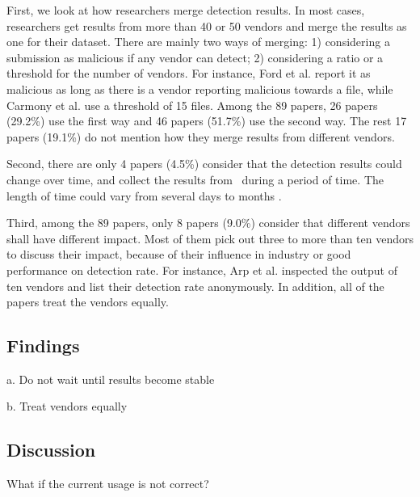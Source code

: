 First, we look at how researchers merge detection results. 
In most cases, researchers get results from more than 40 or 50 vendors and merge the results as one for their dataset. 
There are mainly two ways of merging: 1) considering a submission as malicious if any vendor can detect; 2) considering a ratio or a threshold for the number of vendors. 
For instance, Ford et al. \cite{ford2009analyzing} report it as malicious as long as there is a vendor reporting malicious
towards a file, while Carmony et al. use a threshold of 15 files. 
Among the 89 papers, 26 papers (29.2\%) use the first way and 46 papers  (51.7\%) use the second way. 
The rest 17 papers (19.1\%) do not mention how they merge results from different vendors.

Second, there are only 4 papers (4.5\%) consider that the detection results could change over time, and collect the results from \vt\ during a period of time. 
The length of time could vary from several days \cite{kharraz2016unveil, rajab2013camp} to months \cite{neeles, wressnegger2017looking}. 

Third, among the 89 papers, only 8 papers (9.0\%) consider that different vendors shall have different impact. 
Most of them pick out three to more than ten vendors to discuss their impact, because of their influence in industry or good performance on detection rate. 
For instance, Arp et al. \cite{arp2014drebin} inspected the output of ten vendors and list their detection rate anonymously. 
In addition, all of the papers treat the vendors equally. %
\subsection{Findings}
a. Do not wait until results become stable

b. Treat vendors equally

\subsection{Discussion}
What if the current usage is not correct? 
